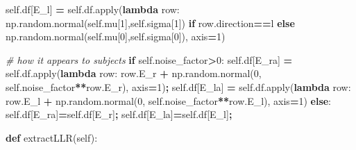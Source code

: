 \documentclass[12pt,twoside]{reedthesis}
\newenvironment{Shaded}{\begin{snugshade}}{\end{snugshade}}
\newcommand{\BuiltInTok}[1]{#1}
\newcommand{\CommentTok}[1]{\textcolor[rgb]{0.56,0.35,0.01}{\textit{#1}}}
\newcommand{\ControlFlowTok}[1]{\textcolor[rgb]{0.13,0.29,0.53}{\textbf{#1}}}
\newcommand{\DecValTok}[1]{\textcolor[rgb]{0.00,0.00,0.81}{#1}}
\newcommand{\KeywordTok}[1]{\textcolor[rgb]{0.13,0.29,0.53}{\textbf{#1}}}
\newcommand{\NormalTok}[1]{#1}
\newcommand{\OperatorTok}[1]{\textcolor[rgb]{0.81,0.36,0.00}{\textbf{#1}}}
\newcommand{\StringTok}[1]{\textcolor[rgb]{0.31,0.60,0.02}{#1}}
\newcommand{\VariableTok}[1]{\textcolor[rgb]{0.00,0.00,0.00}{#1}}
\begin{document}
\begin{Shaded}
\begin{Highlighting}[]
        \VariableTok{self}\NormalTok{.df[}\StringTok{\textquotesingle{}E\_l\textquotesingle{}}\NormalTok{] }\OperatorTok{=} \VariableTok{self}\NormalTok{.df.}\BuiltInTok{apply}\NormalTok{(}\KeywordTok{lambda}\NormalTok{ row: }
\NormalTok{               np.random.normal(}\VariableTok{self}\NormalTok{.mu[}\DecValTok{1}\NormalTok{],}\VariableTok{self}\NormalTok{.sigma[}\DecValTok{1}\NormalTok{]) }
               \ControlFlowTok{if}\NormalTok{ row.direction}\OperatorTok{==}\StringTok{\textquotesingle{}l\textquotesingle{}} 
               \ControlFlowTok{else}\NormalTok{ np.random.normal(}\VariableTok{self}\NormalTok{.mu[}\DecValTok{0}\NormalTok{],}\VariableTok{self}\NormalTok{.sigma[}\DecValTok{0}\NormalTok{]),}
\NormalTok{               axis}\OperatorTok{=}\DecValTok{1}\NormalTok{)}
        
        \CommentTok{\# how it appears to subjects}
        \ControlFlowTok{if} \VariableTok{self}\NormalTok{.noise\_factor}\OperatorTok{\textgreater{}}\DecValTok{0}\NormalTok{:}
          \VariableTok{self}\NormalTok{.df[}\StringTok{\textquotesingle{}E\_ra\textquotesingle{}}\NormalTok{] }\OperatorTok{=} \VariableTok{self}\NormalTok{.df.}\BuiltInTok{apply}\NormalTok{(}\KeywordTok{lambda}\NormalTok{ row: row.E\_r }\OperatorTok{+}
\NormalTok{                 np.random.normal(}\DecValTok{0}\NormalTok{, }\VariableTok{self}\NormalTok{.noise\_factor}\OperatorTok{**}\NormalTok{row.E\_r), }
\NormalTok{                 axis}\OperatorTok{=}\DecValTok{1}\NormalTok{)}\OperatorTok{;}
          \VariableTok{self}\NormalTok{.df[}\StringTok{\textquotesingle{}E\_la\textquotesingle{}}\NormalTok{] }\OperatorTok{=}  \VariableTok{self}\NormalTok{.df.}\BuiltInTok{apply}\NormalTok{(}\KeywordTok{lambda}\NormalTok{ row: row.E\_l }\OperatorTok{+}
\NormalTok{                 np.random.normal(}\DecValTok{0}\NormalTok{, }\VariableTok{self}\NormalTok{.noise\_factor}\OperatorTok{**}\NormalTok{row.E\_l), }
\NormalTok{                 axis}\OperatorTok{=}\DecValTok{1}\NormalTok{)}
        \ControlFlowTok{else}\NormalTok{:}
          \VariableTok{self}\NormalTok{.df[}\StringTok{\textquotesingle{}E\_ra\textquotesingle{}}\NormalTok{]}\OperatorTok{=}\VariableTok{self}\NormalTok{.df[}\StringTok{\textquotesingle{}E\_r\textquotesingle{}}\NormalTok{]}\OperatorTok{;}
          \VariableTok{self}\NormalTok{.df[}\StringTok{\textquotesingle{}E\_la\textquotesingle{}}\NormalTok{]}\OperatorTok{=}\VariableTok{self}\NormalTok{.df[}\StringTok{\textquotesingle{}E\_l\textquotesingle{}}\NormalTok{]}\OperatorTok{;}
    
    \KeywordTok{def}\NormalTok{ extractLLR(}\VariableTok{self}\NormalTok{):}
        

\end{Highlighting}
\end{Shaded}
\end{document}
